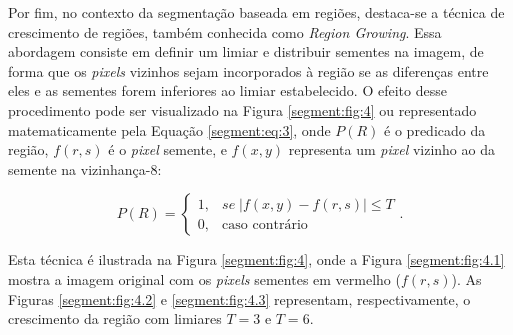 Por fim, no contexto da segmentação baseada em regiões, destaca-se a técnica de crescimento de regiões, também conhecida como \textit{Region Growing}. Essa abordagem consiste em definir um limiar e distribuir sementes na imagem, de forma que os \textit{pixels} vizinhos sejam incorporados à região se as diferenças entre eles e as sementes forem inferiores ao limiar estabelecido. O efeito desse procedimento pode ser visualizado na Figura \ref{segment:fig:4} ou representado matematicamente pela Equação \ref{segment:eq:3}, onde $P(R)$ é o predicado da região, $f(r,s)$ é o \textit{pixel} semente, e $f(x,y)$ representa um \textit{pixel} vizinho ao da semente na vizinhança-8:

\begin{equation}
\label{segment:eq:3}
P(R) = \begin{cases}
    1, & se \; |f(x,y) - f(r,s)| \leq T \\
    0,      &  \text{caso contrário}
\end{cases}.
\end{equation}

Esta técnica é ilustrada na Figura \ref{segment:fig:4}, onde a Figura \ref{segment:fig:4.1} mostra a imagem original com os \textit{pixels} sementes em vermelho ($f(r,s)$). As Figuras \ref{segment:fig:4.2} e \ref{segment:fig:4.3} representam, respectivamente, o crescimento da região com limiares $T = 3$ e $T = 6$.

